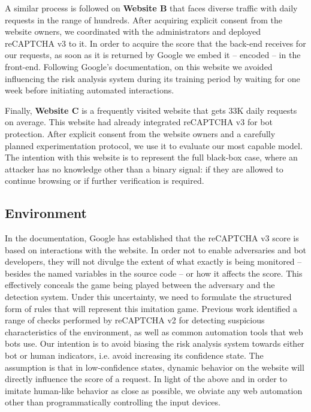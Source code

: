 A similar process is followed on \textbf{Website B} that faces diverse traffic with daily requests in the range of hundreds.
After acquiring explicit consent from the website owners, we coordinated with the administrators and deployed reCAPTCHA v3 to it.
In order to acquire the score that the back-end receives for our requests, as soon as it is returned by Google we embed it -- encoded -- in the front-end.
Following Google's documentation, on this website we avoided influencing the risk analysis system during its training period by waiting for one week before initiating automated interactions.

Finally, \textbf{Website C} is a frequently visited website that gets 33K daily requests on average.
This website had already integrated reCAPTCHA v3 for bot protection.
After explicit consent from the website owners and a carefully planned experimentation protocol, we use it to evaluate our most capable model.
The intention with this website is to represent the full black-box case, where an attacker has no knowledge other than a binary signal: if they are allowed to continue browsing or if further verification is required.


\subsection{Environment}

In the documentation, Google has established that the reCAPTCHA v3 score is based on interactions with the website.
In order not to enable adversaries and bot developers, they will not divulge the extent of what exactly is being monitored -- besides the named variables in the source code -- or how it affects the score.
This effectively conceals the game being played between the adversary and the detection system.
Under this uncertainty, we need to formulate the structured form of rules that will represent this imitation game.
Previous work \cite{sivakorn2016robot, li2021good} identified a range of checks performed by reCAPTCHA v2 for detecting suspicious characteristics of the environment, as well as common automation tools that web bots use.
Our intention is to avoid biasing the risk analysis system towards either bot or human indicators, i.e. avoid increasing its confidence state.
The assumption is that in low-confidence states, dynamic behavior on the website will directly influence the score of a request. 
In light of the above and in order to imitate human-like behavior as close as possible, we obviate any web automation other than programmatically controlling the input devices.

